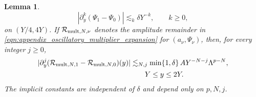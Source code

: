 \documentclass[11pt]{amsart}
\newtheorem{lemma}[theorem]{Lemma}
\theoremstyle{definition}
\theoremstyle{remark}
\numberwithin{equation}{section}
\newcommand{\mc}[1]{\mathcal{#1}}
\begin{document}
\begin{lemma}
\[        |\partial_y^k(\Psi_1-\Psi_0)|\lesssim_k\delta Y^{-k},
        \qquad k\geq0,
    \]
    on $(Y/4,4Y)$. If $\mc{R}_{\textup{mult},N,\nu}$ denotes the amplitude remainder in \eqref{eqn:appendix_oscillatory_multiplier_expansion} for $(a_\nu,\Psi_\nu)$, then, for every integer $j\geq0$,
    \begin{equation}\label{eqn:appendix_oscillatory_multiplier_amplitude_difference}
        \begin{aligned}
            |\partial_y^j(\mc{R}_{\textup{mult},N,1}-\mc{R}_{\textup{mult},N,0})(y)|
            &\lesssim_{N,j}\min\{1,\delta\}\,A Y^{-N-j}\Lambda^{p-N},\\
            &\hspace{2em}Y\leq y\leq2Y.
        \end{aligned}
    \end{equation}
    The implicit constants are independent of $\delta$ and depend only on $p,N,j$.
\end{lemma}
\end{document}
